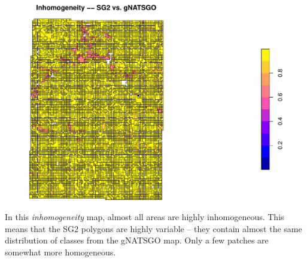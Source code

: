 \documentclass[
  letterpaper,
  DIV=11,
  numbers=noendperiod]{scrartcl}
\newenvironment{Shaded}{\begin{snugshade}}{\end{snugshade}}
\newcommand{\AttributeTok}[1]{\textcolor[rgb]{0.40,0.45,0.13}{#1}}
\newcommand{\FunctionTok}[1]{\textcolor[rgb]{0.28,0.35,0.67}{#1}}
\newcommand{\NormalTok}[1]{\textcolor[rgb]{0.00,0.23,0.31}{#1}}
\newcommand{\SpecialCharTok}[1]{\textcolor[rgb]{0.37,0.37,0.37}{#1}}
\newcommand{\StringTok}[1]{\textcolor[rgb]{0.13,0.47,0.30}{#1}}
\begin{document}
\begin{figure}[H]

{\centering \includegraphics{PatternAnalysisWorkshopTutorial_files/figure-pdf/vmaps.gnatsgo.sg.homogeneity-1.pdf}

}

\end{figure}

In this \emph{inhomogeneity} map, almost all areas are highly
inhomogeneous. This means that the SG2 polygons are highly variable --
they contain almost the same distribution of classes from the gNATSGO
map. Only a few patches are somewhat more homogeneous.

\begin{Shaded}
\end{Shaded}
\end{document}
